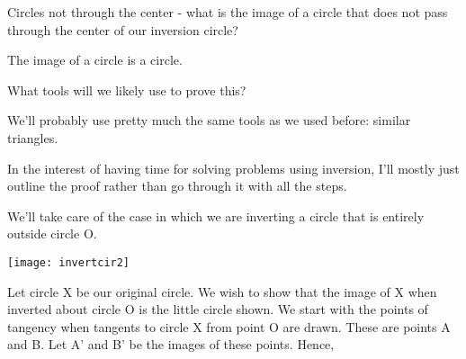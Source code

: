 Circles not through the center - what is the image of a circle that does not pass through the center of our inversion circle?




The image of a circle is a circle.

What tools will we likely use to prove this?





We'll probably use pretty much the same tools as we used before: similar triangles.

In the interest of having time for solving problems using inversion, I'll mostly just outline the proof rather than go through it with all the steps.

We'll take care of the case in which we are inverting a circle that is entirely outside circle O.


\begin{center}
    \texttt{[image: invertcir2]}    
\end{center}
Let circle X be our original circle.  We wish to show that the image of X when inverted about circle O is the little circle shown.  We start with the points of tangency when tangents to circle X from point O are drawn.  These are points A and B.  Let A' and B' be the images of these points.  Hence,

